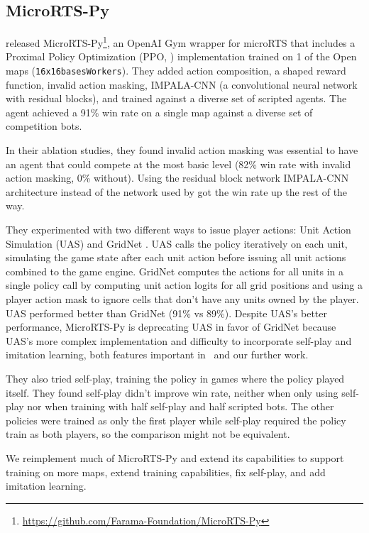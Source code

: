 \documentclass{article}
\begin{document}
\subsection{MicroRTS-Py}
\citet{DBLP:journals/corr/abs-2105-13807} released MicroRTS-Py\footnote{\url{https://github.com/Farama-Foundation/MicroRTS-Py}}, an OpenAI Gym
wrapper for microRTS that includes a Proximal Policy Optimization (PPO, \citet{DBLP:journals/corr/SchulmanWDRK17}) implementation
trained on 1 of the Open maps (\texttt{16x16basesWorkers}). They added action composition, a shaped reward function, invalid action
masking, IMPALA-CNN (a convolutional neural network with residual blocks), and trained
against a diverse set of scripted agents. The agent achieved a
91\% win rate on a single map against a diverse set of competition bots.

In their ablation studies, they found invalid action masking was essential to have an agent that could compete at
the most basic level (82\% win rate with invalid action masking, 0\% without). Using the
residual block network IMPALA-CNN architecture instead of the network used by
\citet{DBLP:journals/corr/MnihKSGAWR13} got the win rate up the rest of the way.

They experimented with two different ways to issue player actions: Unit Action Simulation (UAS)
and GridNet \citep{pmlr-v97-han19a}. UAS calls the policy iteratively on each unit, simulating the game state
after each unit action before issuing all unit actions combined to the game engine. GridNet
computes the actions for all units in a single policy call by computing unit action
logits for all grid positions and using a player action mask to ignore cells that don't
have any units owned by the player. UAS performed better than GridNet (91\% vs 89\%).
Despite UAS's better performance, MicroRTS-Py is deprecating UAS in favor of GridNet
because UAS's more complex implementation and difficulty to incorporate self-play and
imitation learning, both features important in \agentName\ and our further work.

They also tried self-play, training the policy in games where the policy played itself. 
They found self-play didn't improve win rate,
neither when only using self-play nor when training with half self-play and half scripted
bots. The other policies were trained as only the first player while self-play required
the policy train as both players, so the comparison might not be equivalent.

We reimplement much of MicroRTS-Py and extend its capabilities to support training on
more maps, extend training capabilities, fix self-play, and add imitation learning.
\end{document}
